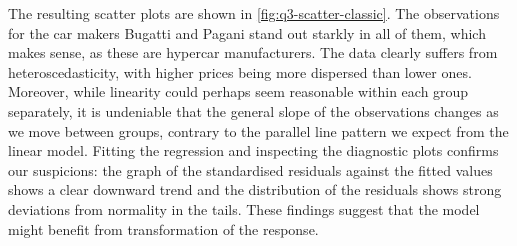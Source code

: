 \documentclass[titlepage]{article}
\begin{document}
The resulting scatter plots are shown in \cref{fig:q3-scatter-classic}. The observations for the car makers Bugatti and Pagani stand out starkly in all of them, which makes sense, as these are hypercar manufacturers. The data clearly suffers from heteroscedasticity, with higher prices being more dispersed than lower ones. Moreover, while linearity could perhaps seem reasonable within each group separately, it is undeniable that the general slope of the observations changes as we move between groups, contrary to the parallel line pattern we expect from the linear model. Fitting the regression and inspecting the diagnostic plots confirms our suspicions: the graph of the standardised residuals against the fitted values shows a clear downward trend and the distribution of the residuals shows strong deviations from normality in the tails. These findings suggest that the model might benefit from transformation of the response.

\end{document}
